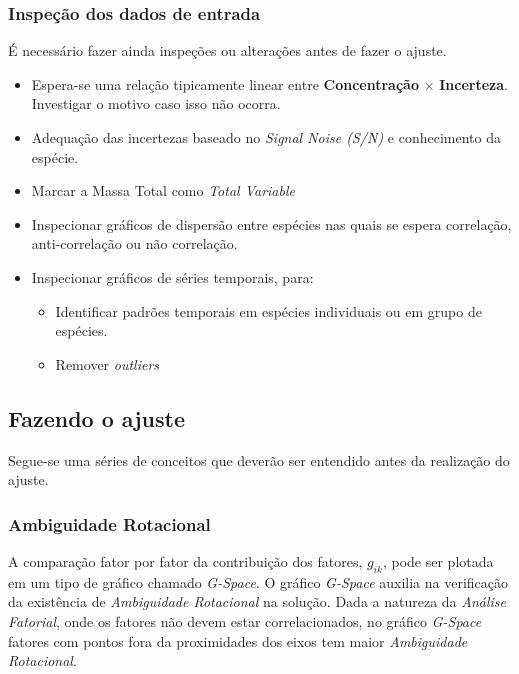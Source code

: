 \subsubsection{Inspeção dos dados de entrada}

É necessário fazer ainda inspeções ou alterações antes de fazer o ajuste.

\begin{itemize}
  \item Espera-se uma relação tipicamente linear entre 
        \textbf{Concentração} $\times$ \textbf{Incerteza}.  
        Investigar o motivo caso isso não ocorra. 
  \item Adequação das incertezas baseado no \textit{Signal Noise (S/N)} e 
        conhecimento da espécie. 
  \item Marcar a Massa Total como \textit{Total Variable}
  \item Inspecionar gráficos de dispersão entre espécies nas quais se espera 
        correlação, anti-correlação ou não correlação. 
  \item Inspecionar gráficos de séries temporais, para:
    \begin{itemize}
      \item Identificar padrões temporais em espécies individuais ou em grupo 
            de espécies.
      \item Remover \textit{outliers} 
    \end{itemize}
\end{itemize}

\subsection{Fazendo o ajuste}

Segue-se uma séries de conceitos que deverão ser entendido antes da realização 
do ajuste. 

\subsubsection{Ambiguidade Rotacional}

A comparação fator por fator da contribuição dos fatores, $g_{ik}$, 
pode ser plotada em um tipo de gráfico chamado \textit{G-Space}. 
O gráfico \textit{G-Space} auxilia na verificação da existência de 
\textit{Ambiguidade Rotacional} na solução. 
Dada a natureza da \textit{Análise Fatorial}, onde os fatores não devem estar 
correlacionados, no gráfico \textit{G-Space} fatores com pontos fora da 
proximidades dos eixos tem maior \textit{Ambiguidade Rotacional}. 

